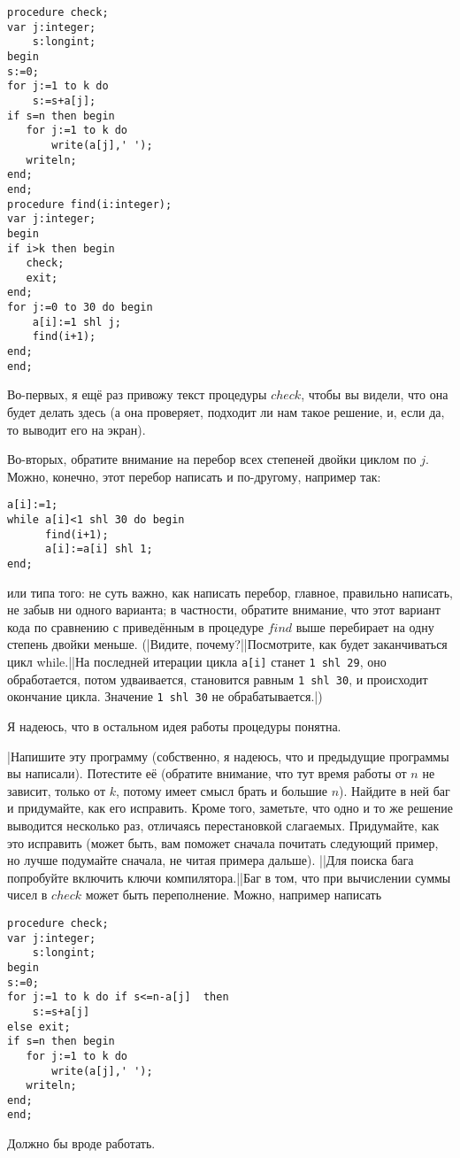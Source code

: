 \begin{codesample}\begin{verbatim}
procedure check;
var j:integer;  
    s:longint;
begin
s:=0;
for j:=1 to k do
    s:=s+a[j];
if s=n then begin
   for j:=1 to k do
       write(a[j],' ');
   writeln;
end;
end;
procedure find(i:integer);
var j:integer;
begin
if i>k then begin
   check;
   exit;
end;
for j:=0 to 30 do begin
    a[i]:=1 shl j;
    find(i+1);
end;
end;
\end{verbatim}\end{codesample}

Во-первых, я ещё раз привожу текст процедуры $check$, чтобы вы видели, что она 
будет делать здесь (а она проверяет, подходит ли нам такое решение, и, если да, 
то выводит его на экран).

Во-вторых, обратите внимание на перебор всех степеней двойки циклом по $j$. 
Можно, конечно, этот перебор написать и по-другому, например так:

\begin{codesampleo}\begin{verbatim}
a[i]:=1;
while a[i]<1 shl 30 do begin
      find(i+1);
      a[i]:=a[i] shl 1;
end;
\end{verbatim}\end{codesampleo}
или типа того: не суть важно, как написать перебор, главное, правильно написать, не 
забыв ни одного варианта; в частности, обратите внимание, что этот вариант кода по сравнению с приведённым в 
процедуре $find$ выше перебирает на одну степень двойки меньше. (|Видите, почему?||Посмотрите, как будет заканчиваться цикл while.||На последней итерации цикла \texttt{a[i]} станет \texttt{1 shl 29}, оно обработается, потом удваивается, становится равным \texttt{1 shl 30}, и происходит окончание цикла. Значение \texttt{1 shl 30} не обрабатывается.|)

Я надеюсь, что в остальном идея работы процедуры понятна.

\task|Напишите эту программу (собственно, я надеюсь, что и предыдущие 
   программы вы написали). 
  Потестите её (обратите внимание, что тут время работы от $n$ не зависит, 
   только от $k$, потому имеет смысл брать и большие $n$). Найдите в ней баг и 
   придумайте, как его исправить. 
 Кроме того, заметьте, что одно и то же решение выводится несколько 
   раз, отличаясь перестановкой слагаемых. Придумайте, как это исправить (может 
   быть, вам поможет сначала почитать следующий пример, но лучше подумайте 
   сначала, не читая примера дальше).
||Для поиска бага попробуйте включить ключи компилятора.||Баг в том, что при вычислении суммы чисел в $check$ может быть переполнение. Можно, например 
 написать
\begin{codesampleo}\begin{verbatim}
procedure check;
var j:integer;  
    s:longint;
begin
s:=0;
for j:=1 to k do if s<=n-a[j]  then
    s:=s+a[j]
else exit;
if s=n then begin
   for j:=1 to k do
       write(a[j],' ');
   writeln;
end;
end;
\end{verbatim}\end{codesampleo}
Должно бы вроде работать.

